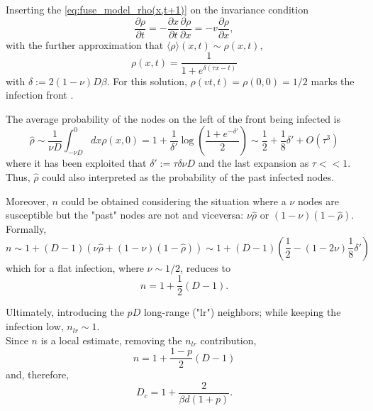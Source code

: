 \documentclass[a4paper,12pt,twoside]{book} %
\theoremstyle{definition}
\begin{document}
Inserting the \autoref{eq:fuse_model_rho(x,t+1)} on the invariance condition 
\begin{equation}
	\frac{\partial \rho}{\partial t} = - \frac{\partial x}{\partial t} \frac{\partial \rho}{\partial x} = -v \frac{\partial \rho}{\partial x},
\end{equation}
with the further approximation that $\langle \rho \rangle(x,t) \sim \rho(x,t)$,
\begin{equation}
	\rho(x,t) = \frac{1}{1+e^{\delta(\tau x - t)}}
\end{equation}
with $\delta:= 2(1-\nu)D \beta$. 
For this solution, $\rho(vt,t) = \rho(0,0) = 1/2$ marks the infection front \cite{Thurner::Appendix_NetBasedExpl}. 

The average probability of the nodes on the left of the front being infected is
\begin{equation}
	\hat{\rho} \sim \frac{1}{\nu D} \int_{-\nu D}^{0} dx \rho(x,0) = 1+ \frac{1}{\delta'} \log( \frac{1+e^{-\delta'}}{2} )
	\sim \frac{1}{2} + \frac{1}{8} \delta' + O(\tau^3) 
	\label{eq:rho_hat_fuse_model}
\end{equation}
where it has been exploited that $\delta':=\tau \delta \nu D$ and the last expansion as $\tau<<1$. Thus, $\hat{\rho}$ could also interpreted as the probability of the past infected nodes.

Moreover, $n$ could be obtained considering the situation where a $\nu$ nodes are susceptible but the "past" nodes are not and viceversa: $\nu \hat{\rho} \text{ or } (1-\nu)(1- \hat{\rho})$. 
\\Formally,
\begin{equation}
	n \sim 1+ (D-1)(\nu\hat{\rho}+(1-\nu)(1-\hat{\rho}))
	\sim 1+ (D-1)(\frac{1}{2} - (1-2\nu) \frac{1}{8} \delta')
\end{equation}
which for a flat infection, where $\nu\sim 1/2$, reduces to
\begin{equation}
	n = 1 + \frac{1}{2}(D-1).
\end{equation} 

Ultimately, introducing the $pD$ long-range ("lr") neighbors; while keeping the infection low, $n_{lr} \sim 1$.
\\Since $n$ is a local estimate, removing the $n_{lr}$ contribution,
\begin{equation}
	n = 1 + \frac{1-p}{2}(D-1)
\end{equation}   
and, therefore,
\begin{equation}
	D_c = 1+ \frac{2}{\beta d(1+p)}.
	\label{eq:final_D_c_fuse_network}
\end{equation}
\end{document}
